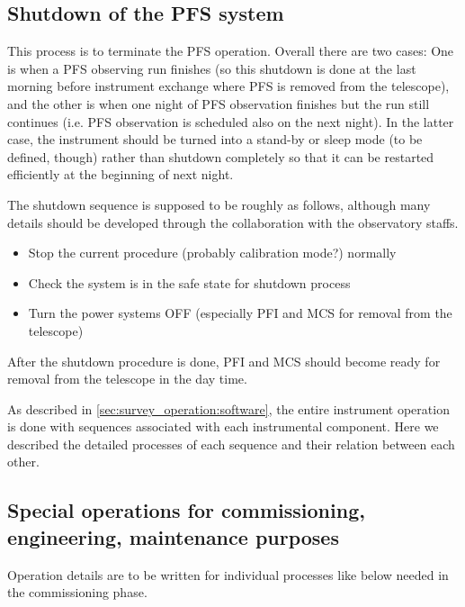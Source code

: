 \documentclass[a4paper]{article}
\begin{document}
\subsection{Shutdown of the PFS system}

This process is to terminate the PFS operation. Overall there are two
cases: One is when a PFS observing run finishes (so this shutdown is
done at the last morning before instrument exchange where PFS is
removed from the telescope), and the other is when one night of PFS
observation finishes but the run still continues (i.e. PFS observation
is scheduled also on the next night). In the latter case, the
instrument should be turned into a stand-by or sleep mode (to be
defined, though) rather than shutdown completely so that it can be
restarted efficiently at the beginning of next night.

The shutdown sequence is supposed to be roughly as follows, although
many details should be developed through the collaboration with the
observatory staffs.

\begin{itemize}
\item Stop the current procedure (probably calibration mode?) normally
\item Check the system is in the safe state for shutdown process
\item Turn the power systems OFF (especially PFI and MCS for removal from the telescope)
\end{itemize}

After the shutdown procedure is done, PFI and MCS should become ready
for removal from the telescope in the day time.

As described in \ref{sec:survey_operation:software}, the entire instrument operation is done with sequences associated with each instrumental component. Here we described the detailed processes of each sequence and their relation between each other.

\subsection{Special operations for commissioning, engineering, maintenance purposes\label{sec:detail_ope_plan:engineering}}

Operation details are to be written for individual processes like
below needed in the commissioning phase.
\end{document}
